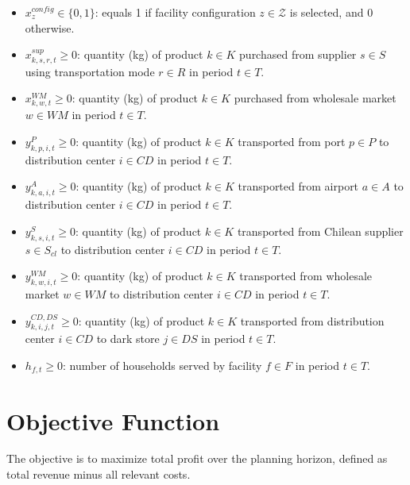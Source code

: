 \documentclass[12pt]{article}
\begin{document}
\begin{itemize}

    \item $x^{config}_z \in \{0,1\}$: equals 1 if facility configuration $z \in \mathcal{Z}$ is selected, and 0 otherwise.

    \item $x^{sup}_{k,s,r,t} \geq 0$: quantity (kg) of product $k \in K$ purchased from supplier $s \in S$ using transportation mode $r \in R$ in period $t \in T$.
    
    \item $x^{WM}_{k,w,t} \geq 0$: quantity (kg) of product $k \in K$ purchased from wholesale market $w \in WM$ in period $t \in T$.
    
    \item $y^{P}_{k,p,i,t} \geq 0$: quantity (kg) of product $k \in K$ transported from port $p \in P$ to distribution center $i \in CD$ in period $t \in T$.
    
    \item $y^{A}_{k,a,i,t} \geq 0$: quantity (kg) of product $k \in K$ transported from airport $a \in A$ to distribution center $i \in CD$ in period $t \in T$.
    
    \item $y^{S}_{k,s,i,t} \geq 0$: quantity (kg) of product $k \in K$ transported from Chilean supplier $s \in S_{cl}$ to distribution center $i \in CD$ in period $t \in T$.
    
    \item $y^{WM}_{k,w,i,t} \geq 0$: quantity (kg) of product $k \in K$ transported from wholesale market $w \in WM$ to distribution center $i \in CD$ in period $t \in T$.
    
    \item $y^{CD,DS}_{k,i,j,t} \geq 0$: quantity (kg) of product $k \in K$ transported from distribution center $i \in CD$ to dark store $j \in DS$ in period $t \in T$.
    
    \item $h_{f,t} \geq 0$: number of households served by facility $f \in F$ in period $t \in T$.
    
    
\end{itemize}
\newpage

\section{Objective Function}

The objective is to maximize total profit over the planning horizon, defined as total revenue minus all relevant costs.
\end{document}
